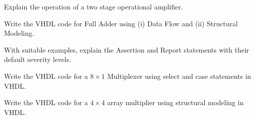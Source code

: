 \item Explain the operation of a two stage operational amplifier.

\ene\ene

\item \iitem Write the VHDL code for Full Adder using (i) Data Flow and (ii) Structural Modeling.

\Or

\item With suitable examples, explain the Assertion and Report statements with their default severity
  levels.

\ene

\item \iitem Write the VHDL code for a $8 \times 1$ Multiplexer using select and case statements in VHDL.

\Or

\item Write the VHDL code for a $ 4 \times 4$ array multiplier using structural modeling in VHDL.

\ene
\markC
\ene

